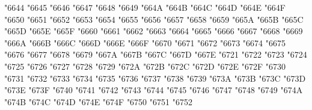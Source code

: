 {\Uchar\jis"6644 %
\Uchar\jis"6645 %
\Uchar\jis"6646 %
\Uchar\jis"6647 %
\Uchar\jis"6648 %
\Uchar\jis"6649 %
\Uchar\jis"664A %
\Uchar\jis"664B %
\Uchar\jis"664C %
\Uchar\jis"664D %
\Uchar\jis"664E %
\Uchar\jis"664F %
\Uchar\jis"6650 %
\Uchar\jis"6651 %
\Uchar\jis"6652 %
\Uchar\jis"6653 %
\Uchar\jis"6654 %
\Uchar\jis"6655 %
\Uchar\jis"6656 %
\Uchar\jis"6657 %
\Uchar\jis"6658 %
\Uchar\jis"6659 %
\Uchar\jis"665A %
\Uchar\jis"665B %
\Uchar\jis"665C %
\Uchar\jis"665D %
\Uchar\jis"665E %
\Uchar\jis"665F %
\Uchar\jis"6660 %
\Uchar\jis"6661 %
\Uchar\jis"6662 %
\Uchar\jis"6663 %
\Uchar\jis"6664 %
\Uchar\jis"6665 %
\Uchar\jis"6666 %
\Uchar\jis"6667 %
\Uchar\jis"6668 %
\Uchar\jis"6669 %
\Uchar\jis"666A %
\Uchar\jis"666B %
\Uchar\jis"666C %
\Uchar\jis"666D %
\Uchar\jis"666E %
\Uchar\jis"666F %
\Uchar\jis"6670 %
\Uchar\jis"6671 %
\Uchar\jis"6672 %
\Uchar\jis"6673 %
\Uchar\jis"6674 %
\Uchar\jis"6675 %
\Uchar\jis"6676 %
\Uchar\jis"6677 %
\Uchar\jis"6678 %
\Uchar\jis"6679 %
\Uchar\jis"667A %
\Uchar\jis"667B %
\Uchar\jis"667C %
\Uchar\jis"667D %
\Uchar\jis"667E %
\Uchar\jis"6721 %
\Uchar\jis"6722 %
\Uchar\jis"6723 %
\Uchar\jis"6724 %
\Uchar\jis"6725 %
\Uchar\jis"6726 %
\Uchar\jis"6727 %
\Uchar\jis"6728 %
\Uchar\jis"6729 %
\Uchar\jis"672A %
\Uchar\jis"672B %
\Uchar\jis"672C %
\Uchar\jis"672D %
\Uchar\jis"672E %
\Uchar\jis"672F %
\Uchar\jis"6730 %
\Uchar\jis"6731 %
\Uchar\jis"6732 %
\Uchar\jis"6733 %
\Uchar\jis"6734 %
\Uchar\jis"6735 %
\Uchar\jis"6736 %
\Uchar\jis"6737 %
\Uchar\jis"6738 %
\Uchar\jis"6739 %
\Uchar\jis"673A %
\Uchar\jis"673B %
\Uchar\jis"673C %
\Uchar\jis"673D %
\Uchar\jis"673E %
\Uchar\jis"673F %
\Uchar\jis"6740 %
\Uchar\jis"6741 %
\Uchar\jis"6742 %
\Uchar\jis"6743 %
\Uchar\jis"6744 %
\Uchar\jis"6745 %
\Uchar\jis"6746 %
\Uchar\jis"6747 %
\Uchar\jis"6748 %
\Uchar\jis"6749 %
\Uchar\jis"674A %
\Uchar\jis"674B %
\Uchar\jis"674C %
\Uchar\jis"674D %
\Uchar\jis"674E %
\Uchar\jis"674F %
\Uchar\jis"6750 %
\Uchar\jis"6751 %
\Uchar\jis"6752 %
}
